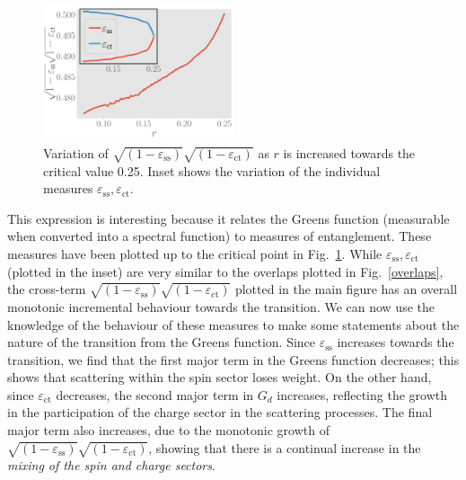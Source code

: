 \documentclass[reprint,superscriptaddress,floatfix]{revtex4-2}
\begin{document}
\begin{figure}[htpb]
	\centering
	\includegraphics[width=0.5\textwidth]{../figures/entanglement.pdf}
	\caption{Variation of \(\sqrt{\left(1 - \varepsilon_\text{ss} \right)}\sqrt{\left(1 - \varepsilon_\text{ct} \right)}\) as \(r\) is increased towards the critical value 0.25. Inset shows the variation of the individual measures \(\varepsilon_\text{ss},\varepsilon_\text{ct}\).}
	\label{entng}
\end{figure}

This expression is interesting because it relates the Greens function (measurable when converted into a spectral function) to measures of entanglement.
These measures have been plotted up to the critical point in Fig.~\ref{entng}.
While \(\varepsilon_\text{ss},\varepsilon_\text{ct}\) (plotted in the inset) are very similar to the overlaps plotted in Fig.~\ref{overlaps}, the cross-term \(\sqrt{\left(1 - \varepsilon_\text{ss} \right)}\sqrt{\left(1 - \varepsilon_\text{ct} \right)}\) plotted in the main figure has an overall monotonic incremental behaviour towards the transition.
We can now use the knowledge of the behaviour of these measures to make some statements about the nature of the transition from the Greens function.
Since \(\varepsilon_\text{ss}\) increases towards the transition, we find that the first major term in the Greens function decreases; this shows that scattering within the spin sector loses weight.
On the other hand, since \(\varepsilon_\text{ct}\) decreases, the second major term in \(G_d\) increases, reflecting the growth in the participation of the charge sector in the scattering processes.
The final major term also increases, due to the monotonic growth of \(\sqrt{\left(1 - \varepsilon_\text{ss} \right)}\sqrt{\left(1 - \varepsilon_\text{ct} \right)}\), showing that there is a continual increase in the {\it mixing of the spin and charge sectors}.
\end{document}
